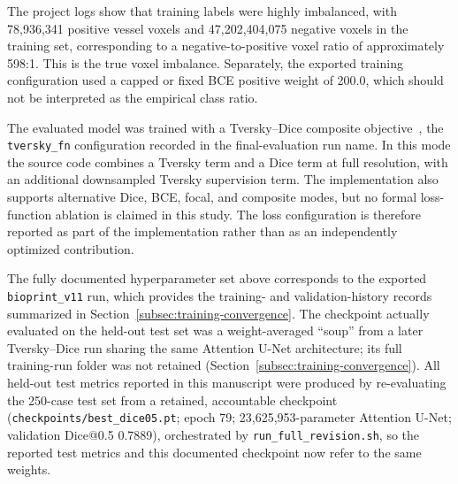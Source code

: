 \documentclass[anonymous]{iopjournal}
\begin{document}
The project logs show that training labels were highly imbalanced, with 78,936,341 positive vessel voxels and 47,202,404,075 negative voxels in the training set, corresponding to a negative-to-positive voxel ratio of approximately 598:1. This is the true voxel imbalance. Separately, the exported training configuration used a capped or fixed BCE positive weight of 200.0, which should not be interpreted as the empirical class ratio.

The evaluated model was trained with a Tversky--Dice composite objective~\cite{salehi2017,sudre2017}, the \texttt{tversky\_fn} configuration recorded in the final-evaluation run name. In this mode the source code combines a Tversky term and a Dice term at full resolution, with an additional downsampled Tversky supervision term. The implementation also supports alternative Dice, BCE, focal, and composite modes, but no formal loss-function ablation is claimed in this study. The loss configuration is therefore reported as part of the implementation rather than as an independently optimized contribution.

The fully documented hyperparameter set above corresponds to the exported \texttt{bioprint\_v11} run, which provides the training- and validation-history records summarized in Section~\ref{subsec:training-convergence}. The checkpoint actually evaluated on the held-out test set was a weight-averaged ``soup'' from a later Tversky--Dice run sharing the same Attention U-Net architecture; its full training-run folder was not retained (Section~\ref{subsec:training-convergence}). All held-out test metrics reported in this manuscript were produced by re-evaluating the 250-case test set from a retained, accountable checkpoint (\texttt{checkpoints/best\_dice05.pt}; epoch 79; 23{,}625{,}953-parameter Attention U-Net; validation Dice@0.5 0.7889), orchestrated by \texttt{run\_full\_revision.sh}, so the reported test metrics and this documented checkpoint now refer to the same weights.
\end{document}
